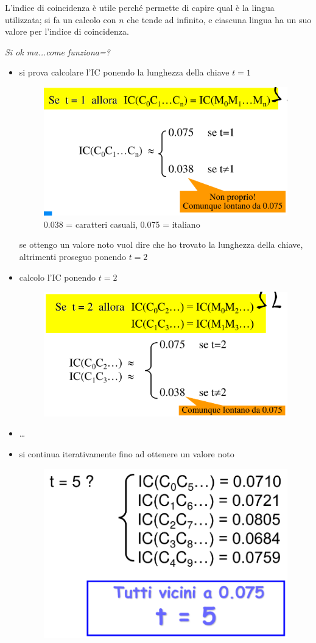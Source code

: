 \noindent L'indice di coincidenza è utile perché permette di capire qual è la lingua utilizzata; si fa 
un calcolo con $n$ che tende ad infinito, e ciascuna lingua ha un suo valore per l'indice di coincidenza.


\noindent \textit{Si ok ma...come funziona=?}

\begin{itemize}
    \item si prova calcolare l'IC ponendo la lunghezza della chiave $t=1$
    
    \begin{figure}[H]
        \centering
        \includegraphics[width=0.65\linewidth]{chapters/chap02/images/ic2.png}
        \caption{0.038 = caratteri casuali, 0.075 = italiano}
    \end{figure}

    \noindent se ottengo un valore noto vuol dire che ho trovato la lunghezza della chiave, altrimenti 
    proseguo ponendo $t=2$

    \item calcolo l'IC ponendo $t=2$
    
    \begin{figure}[H]
        \centering
        \includegraphics[width=0.65\linewidth]{chapters/chap02/images/ic3.png}
    \end{figure}
    
    \item \dots
    \item si continua iterativamente fino ad ottenere un valore noto 
    
    \begin{figure}[H]
        \centering
        \includegraphics[width=0.5\linewidth]{chapters/chap02/images/ic4.png}
    \end{figure}   

\end{itemize}


